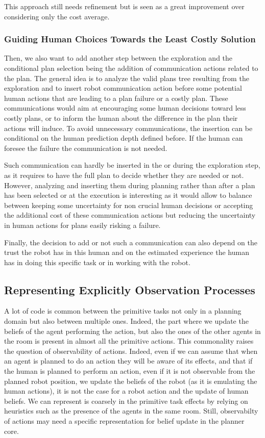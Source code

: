 \documentclass[a4paper,11pt,twoside]{StyleThese}
\begin{document}
This approach still needs refinement but is seen as a great improvement over considering only the cost average.

\subsubsection{Guiding Human Choices Towards the Least Costly Solution}
Then, we also want to add another step between the  exploration and the conditional plan selection being the addition of communication actions related to the plan. The general idea is to analyze the valid plans tree resulting from the  exploration and to insert robot communication action before some potential human actions that are leading to a plan failure or a costly plan. These communications would aim at encouraging some human decisions toward less costly plans, or to inform the human about the difference in the plan their actions will induce. To avoid unnecessary communications, the insertion can be conditional on the human prediction depth defined before. If the human can foresee the failure the communication is not needed.

Such communication can hardly be inserted in the  or during the  exploration step, as it requires to have the full plan to decide whether they are needed or not. However, analyzing and inserting them during planning rather than after a plan has been selected or at the execution is interesting as it would allow to balance between keeping some uncertainty for non crucial human decisions or accepting the additional cost of these communication actions but reducing the uncertainty in human actions for plans easily risking a failure.

Finally, the decision to add or not such a communication can also depend on the trust the robot has in this human and on the estimated experience the human has in doing this specific task or in working with the robot.

\subsection{Representing Explicitly Observation Processes}
A lot of code is common between the primitive tasks not only in a planning domain but also between multiple ones. Indeed, the part where we update the beliefs of the agent performing the action, but also the ones of the other agents in the room is present in almost all the primitive actions. This commonality raises the question of observability of actions. Indeed, even if we can assume that when an agent is planned to do an action they will be aware of its effects, and that if the human is planned to perform an action, even if it is not observable from the planned robot position, we update the beliefs of the robot (as it is emulating the human actions), it is not the case for a robot action and the update of human beliefs. We can represent is coarsely in the primitive task effects by relying on heuristics such as the presence of the agents in the same room. Still, observabilty of actions may need a specific representation for belief update in the planner core.
\end{document}
